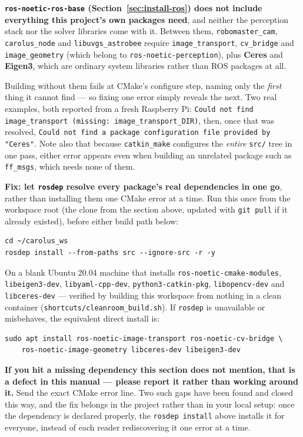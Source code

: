 \documentclass[11pt]{report}
\newenvironment{warningbox}%
  {\begin{lrbox}{\warnbox}\begin{minipage}{0.90\textwidth}}%
  {\end{minipage}\end{lrbox}%
   \begin{center}\fcolorbox{black}{codebg}{\usebox{\warnbox}}\end{center}}
\begin{document}
\textbf{\texttt{ros-noetic-ros-base} (Section~\ref{sec:install-ros}) does
not include everything this project's own packages need}, and neither the
perception stack nor the solver libraries come with it. Between them,
\texttt{robomaster\_cam}, \texttt{carolus\_node} and
\texttt{libuvgs\_astrobee} require \texttt{image\_transport},
\texttt{cv\_bridge} and \texttt{image\_geometry} (which belong to
\texttt{ros-noetic-perception}), plus \textbf{Ceres} and \textbf{Eigen3},
which are ordinary system libraries rather than ROS packages at all.

Building without them fails at CMake's configure step, naming only the
\emph{first} thing it cannot find --- so fixing one error simply reveals
the next. Two real examples, both reported from a fresh Raspberry Pi:
\texttt{Could not find image\_transport (missing:
image\_transport\_DIR)}, then, once that was resolved,
\texttt{Could not find a package configuration file provided by "Ceres"}.
Note also that because \texttt{catkin\_make} configures the \emph{entire}
\texttt{src/} tree in one pass, either error appears even when building an
unrelated package such as \texttt{ff\_msgs}, which needs none of them.

\textbf{Fix: let \texttt{rosdep} resolve every package's real dependencies
in one go}, rather than installing them one CMake error at a time. Run
this once from the workspace root (the clone from the section above,
updated with \texttt{git pull} if it already existed), before either build
path below:
\begin{lstlisting}[style=shell]
cd ~/carolus_ws
rosdep install --from-paths src --ignore-src -r -y
\end{lstlisting}
On a blank Ubuntu 20.04 machine that installs
\texttt{ros-noetic-cmake-modules}, \texttt{libeigen3-dev},
\texttt{libyaml-cpp-dev}, \texttt{python3-catkin-pkg},
\texttt{libopencv-dev} and \texttt{libceres-dev} --- verified by building
this workspace from nothing in a clean container
(\texttt{shortcuts/cleanroom\_build.sh}). If \texttt{rosdep} is
unavailable or misbehaves, the equivalent direct install is:
\begin{lstlisting}[style=shell]
sudo apt install ros-noetic-image-transport ros-noetic-cv-bridge \
    ros-noetic-image-geometry libceres-dev libeigen3-dev
\end{lstlisting}

\begin{warningbox}
\textbf{If you hit a missing dependency this section does not mention,
that is a defect in this manual --- please report it rather than working
around it.} Send the exact CMake error line. Two such gaps have been found
and closed this way, and the fix belongs in the project rather than in
your local setup: once the dependency is declared properly, the
\texttt{rosdep install} above installs it for everyone, instead of each
reader rediscovering it one error at a time.
\end{warningbox}
\end{document}
